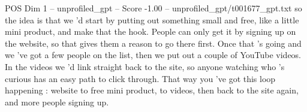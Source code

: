 \begin{textsample}{POS Dim 1 – unprofiled\_gpt – Score -1.00 – unprofiled\_gpt/t001677\_gpt.txt}  \label{ex:f1_pos_023}
so the idea is that we ’d start by putting out something small and free, like a little mini product, and make that the hook.
People can only get it by signing up on the website, so that gives them a reason to go there first.
Once that ’s going and we ’ve got a few people on the list, then we put out a couple of YouTube videos.
In the videos we ’d link straight back to the site, so anyone watching who ’s curious has an easy path to click through.
That way you ’ve got this loop happening : website to free mini product, to videos, then back to the site again, and more people signing up.

\end{textsample}
